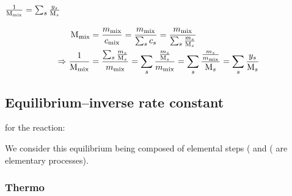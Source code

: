 \subsection{\texorpdfstring{$\frac{1}{\Mm_\text{mix}} = \sum_s \frac{y_s}{\Mm_s}$}{Mixture molar mass}}
\label{demo-Mm}
\[
\begin{split}
\Mm_\text{mix} & = \frac{m_\text{mix}}{c_\text{mix}}
                 = \frac{m_\text{mix}}{\sum_s c_s}
                 = \frac{m_\text{mix}}{\sum_s \frac{m_s}{\Mm_s}}\\
\Rightarrow
\frac{1}{\Mm_\text{mix}}
               & = \frac{\sum_s\frac{m_s}{\Mm_s}}{m_\text{mix}}
                 = \sum_s\frac{\frac{m_s}{\Mm_s}}{m_\text{mix}}
                 = \sum_s\frac{\frac{m_s}{m_\text{mix}}}{\Mm_s}
                 = \sum_s\frac{y_s}{\Mm_s}
\end{split}
\]

\subsection{Equilibrium--inverse rate constant}

for the reaction:
\begin{chemicalEquation}
\label{eq:equat}
\end{chemicalEquation}

We consider this equilibrium being composed of elemental steps
(%
 and
(
are elementary processes). 

\subsubsection{Thermo}
\label{demo-eq}

